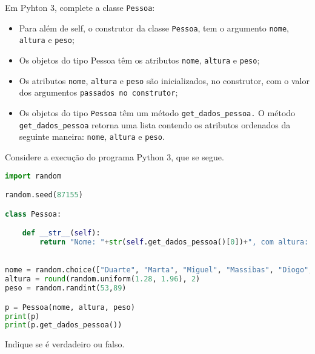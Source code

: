 \documentclass[12pt,varwidth=16cm,border=17pt]{standalone}
\begin{document}
Em Pyhton 3, complete a classe \verb+Pessoa+:

\begin{itemize}
  \item Para além de self, o construtor da classe \verb+Pessoa+, tem o argumento \verb+nome+, \verb+altura+ e \verb+peso+;
  \item Os objetos do tipo Pessoa têm os atributos \verb+nome+, \verb+altura+ e \verb+peso+;
  \item Os atributos \verb+nome+, \verb+altura+ e \verb+peso+ são inicializados, no construtor, com o valor
   dos argumentos \verb+passados no construtor+;
  \item Os objetos do tipo \verb+Pessoa+ têm um método \verb+get_dados_pessoa.+ 
  O método \verb+get_dados_pessoa+ retorna uma lista contendo os atributos ordenados da seguinte maneira: \verb+nome+, \verb+altura+ e \verb+peso+. 
\end{itemize}

Considere a execução do programa Python 3, que se segue. 

\begin{lstlisting}[language=Python]
import random

random.seed(87155)

class Pessoa:

	def __str__(self):
		return "Nome: "+str(self.get_dados_pessoa()[0])+", com altura: "+str(self.get_dados_pessoa()[1])+" e peso: "+str(self.get_dados_pessoa()[2])
		

nome = random.choice(["Duarte", "Marta", "Miguel", "Massibas", "Diogo", "Madorna", "Rita", "Eduardo", "Pedro", "Margarida", "Beatriz", "Leonor", "Fonseca"])
altura = round(random.uniform(1.28, 1.96), 2)
peso = random.randint(53,89)

p = Pessoa(nome, altura, peso)
print(p)
print(p.get_dados_pessoa())
\end{lstlisting}

Indique se é verdadeiro ou falso.
\end{document}
